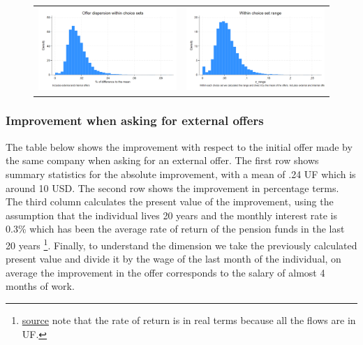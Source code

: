 \documentclass[12pt]{article}
\begin{document}
\begin{figure}[H] 
\caption{}
\label{fig:ie3_5}
\centering{}%
\begin{tabular}{cc}
\includegraphics[scale=0.26]{figures/IE3_dispertion_choice_set.png} & \includegraphics[scale=0.26]{figures/IE3_dispertion_choice_set_range.png}
\end{tabular}
\end{figure}





\subsubsection{Improvement when asking for external offers}

The table below shows the improvement with respect to the initial offer made by the same company when asking for an external offer. The first row shows summary statistics for the absolute improvement, with a mean of .24 UF which is around 10 USD. The second row shows the improvement in percentage terms. The third column calculates the present value of the improvement, using the assumption that the individual lives 20 years and the monthly interest rate is 0.3\% which has been the average rate of return of the pension funds in the last 20 years \footnote{\href{https://bigdatauls.userena.cl/dashboards/rentabilidad-fondo-de-pensiones/}{source} note that the rate of return is in real terms because all the flows are in UF.}. Finally, to understand the dimension we take the previously calculated present value and divide it by the wage of the last month of the individual, on average the improvement in the offer corresponds to the salary of almost 4 months of work.  
\end{document}
